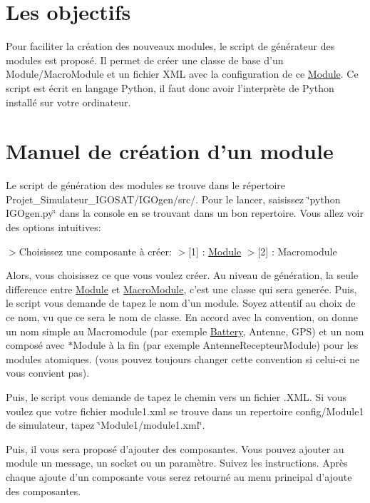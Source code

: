 \hypertarget{docGenereateur_objectif}{}\section{Les objectifs}\label{docGenereateur_objectif}
Pour faciliter la création des nouveaux modules, le script de générateur des modules est proposé. Il permet de créer une classe de base d'un Module/\-Macro\-Module et un fichier X\-M\-L avec la configuration de ce \hyperlink{classModule}{Module}. Ce script est écrit en langage Python, il faut donc avoir l'interprète de Python installé sur votre ordinateur.\hypertarget{docGenereateur_manuel}{}\section{Manuel de création d'un module}\label{docGenereateur_manuel}
Le script de génération des modules se trouve dans le répertoire Projet\-\_\-\-Simulateur\-\_\-\-I\-G\-O\-S\-A\-T/\-I\-G\-Ogen/src/. Pour le lancer, saisissez \char`\"{}python I\-G\-Ogen.\-py\char`\"{} dans la console en se trouvant dans un bon repertoire. Vous allez voir des options intuitives\-:

$>$Choisissez une composante à créer\-: $>$\mbox{[}1\mbox{]} \-: \hyperlink{classModule}{Module} $>$\mbox{[}2\mbox{]} \-: Macromodule

Alors, vous choisissez ce que vous voulez créer. Au niveau de génération, la seule difference entre \hyperlink{classModule}{Module} et \hyperlink{classMacroModule}{Macro\-Module}, c'est une classe qui sera generée. Puis, le script vous demande de tapez le nom d'un module. Soyez attentif au choix de ce nom, vu que ce sera le nom de classe. En accord avec la convention, on donne un nom simple au Macromodule (par exemple \hyperlink{classBattery}{Battery}, Antenne, G\-P\-S) et un nom composé avec $\ast$\-Module à la fin (par exemple Antenne\-Recepteur\-Module) pour les modules atomiques. (vous pouvez toujours changer cette convention si celui-\/ci ne vous convient pas).

Puis, le script vous demande de tapez le chemin vers un fichier .X\-M\-L. Si vous voulez que votre fichier module1.\-xml se trouve dans un repertoire config/\-Module1 de simulateur, tapez \char`\"{}\-Module1/module1.\-xml\char`\"{}.

Puis, il vous sera proposé d'ajouter des composantes. Vous pouvez ajouter au module un message, un socket ou un paramètre. Suivez les instructions. Après chaque ajoute d'un composante vous serez retourné au menu principal d'ajoute des composantes.

